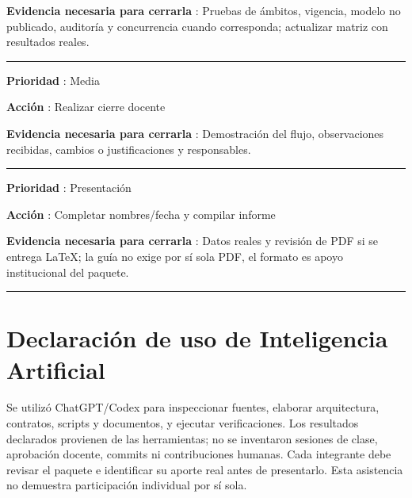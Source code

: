 \documentclass[11pt,a4paper]{article}
\begin{document}
\textbf{Evidencia necesaria para cerrarla }: Pruebas de ámbitos,
vigencia, modelo no publicado, auditoría y concurrencia cuando
corresponda; actualizar matriz con resultados reales.

\medskip\hrule\medskip

\textbf{Prioridad }: Media

\textbf{Acción }: Realizar cierre docente

\textbf{Evidencia necesaria para cerrarla }: Demostración del flujo,
observaciones recibidas, cambios o justificaciones y responsables.

\medskip\hrule\medskip

\textbf{Prioridad }: Presentación

\textbf{Acción }: Completar nombres/fecha y compilar informe

\textbf{Evidencia necesaria para cerrarla }: Datos reales y revisión de
PDF si se entrega LaTeX; la guía no exige por sí sola PDF, el formato es
apoyo institucional del paquete.

\medskip\hrule\medskip


\section{Declaración de uso de Inteligencia
Artificial}\label{informe-declaraciuxf3n-de-uso-de-inteligencia-artificial}

Se utilizó ChatGPT/Codex para inspeccionar fuentes, elaborar
arquitectura, contratos, scripts y documentos, y ejecutar
verificaciones. Los resultados declarados provienen de las herramientas;
no se inventaron sesiones de clase, aprobación docente, commits ni
contribuciones humanas. Cada integrante debe revisar el paquete e
identificar su aporte real antes de presentarlo. Esta asistencia no
demuestra participación individual por sí sola.
\end{document}
